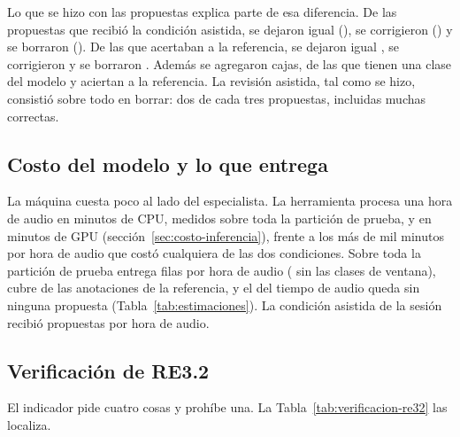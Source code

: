 Lo que se hizo con las propuestas explica parte de esa diferencia. De las
\uProposals{} propuestas que recibió la condición asistida, se dejaron igual
\uProposalsKeptN{} (\uProposalsKept{}), se corrigieron \uProposalsEditedN{}
(\uProposalsEdited{}) y se borraron \uProposalsDeletedN{} (\uProposalsDeleted{}).
De las \uProposalsHit{} que acertaban a la referencia, se dejaron igual
\uProposalsHitKept{}, se corrigieron \uProposalsHitEdited{} y se borraron
\uProposalsHitDeleted{}. Además se agregaron \uBoxesAdded{} cajas, de las que
\uBoxesAddedKnown{} tienen una clase del modelo y \uBoxesAddedHits{} aciertan a la
referencia. La revisión asistida, tal como se hizo, consistió sobre todo en
borrar: dos de cada tres propuestas, incluidas muchas correctas.

\subsection{Costo del modelo y lo que entrega}

La máquina cuesta poco al lado del especialista. La herramienta procesa una hora
de audio en \uCpuMinPerHour{} minutos de CPU, medidos sobre toda la partición de
prueba, y en \uGpuMinPerHour{} minutos de GPU (sección~\ref{sec:costo-inferencia}),
frente a los más de mil minutos por hora de audio que costó cualquiera de las dos
condiciones. Sobre toda la partición de prueba entrega \uProposalsPerHour{} filas
por hora de audio (\uProposalsPerHourBox{} sin las clases de ventana), cubre
\uRecallRows{} de las anotaciones de la referencia, y el
\uAudioWithoutProposals{} del tiempo de audio queda sin ninguna propuesta
(Tabla~\ref{tab:estimaciones}). La
condición asistida de la sesión recibió \uSessionProposalsPerHour{} propuestas por
hora de audio.

\subsection{Verificación de RE3.2}
\label{sec:verificacion-re32}

El indicador pide cuatro cosas y prohíbe una. La Tabla~\ref{tab:verificacion-re32}
las localiza.

